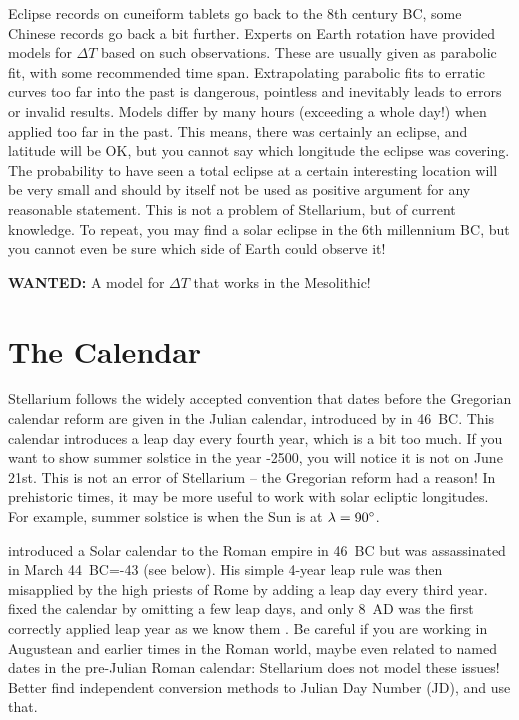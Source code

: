 Eclipse records on cuneiform tablets go back to the 8th century BC, some Chinese 
records go back a bit further. Experts on Earth rotation have provided models 
for $\Delta T$ based on such observations. These are usually given as parabolic fit, 
with some recommended time span. Extrapolating parabolic fits to erratic curves too far into the past is dangerous, 
pointless and inevitably leads to errors or invalid results. Models differ by many hours (exceeding a whole day!)
when applied too far in the past. This means, there was certainly an eclipse, and latitude will be OK, 
but you cannot say which longitude the eclipse was covering. The probability to have seen a total 
eclipse at a certain interesting location will be very small and should by itself not be used as positive argument 
for any reasonable statement. This is not a problem of Stellarium, 
but of current knowledge. To repeat, you may find a solar eclipse in the 6th millennium BC, 
but you cannot even be sure which side of Earth could observe it!

\textbf{WANTED:} A model for $\Delta T$ that works in the Mesolithic! 

\section{The Calendar}
\label{sec:Accuracy:Calendar}

Stellarium follows the widely accepted convention that dates before the Gregorian calendar 
reform are given in the Julian calendar, introduced by  in 46~BC. 
This calendar introduces a leap day every fourth year, which is a bit too much. 
If you want to show summer solstice in the year -2500, you will notice it is not on June 21st. 
This is not an error of Stellarium -- the Gregorian reform had a reason! In prehistoric times, 
it may be more useful to work with solar ecliptic longitudes. For example, summer solstice is
when the Sun is at $\lambda=90\degree$.

 introduced a Solar calendar to the Roman empire
in 46~BC but was assassinated in March 44~BC=-43 (see below).  His
simple 4-year leap rule was then misapplied by the high priests of
Rome by adding a leap day every third year.   fixed the
calendar by omitting a few leap days, and only 8~AD was the first correctly applied leap year as
we know them \citep[\S186, \S189]{Ginzel:ChronologieII}. Be careful if
you are working in Augustean and earlier times in the Roman world,
maybe even related to named dates in the pre-Julian Roman calendar:
Stellarium does not model these issues! Better find independent
conversion methods to Julian Day Number (JD), and use that.

